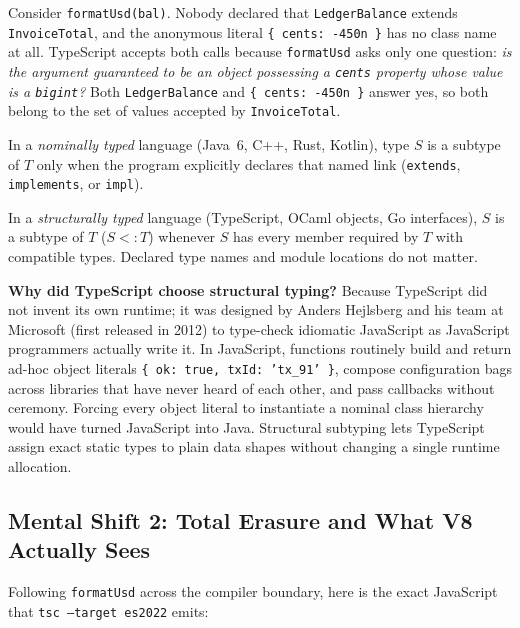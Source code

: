 Consider \texttt{formatUsd(bal)}. Nobody declared that \texttt{LedgerBalance} extends \texttt{InvoiceTotal}, and the anonymous literal \texttt{\{ cents: -450n \}} has no class name at all. TypeScript accepts both calls because \texttt{formatUsd} asks only one question: \emph{is the argument guaranteed to be an object possessing a \texttt{cents} property whose value is a \texttt{bigint}?} Both \texttt{LedgerBalance} and \texttt{\{ cents: -450n \}} answer yes, so both belong to the set of values accepted by \texttt{InvoiceTotal}.

\begin{definition}
\label{ch09:def-nominal-vs-structural}
In a \emph{nominally typed} language (Java~6, C++, Rust, Kotlin), type $S$ is a subtype of $T$ only when the program explicitly declares that named link (\texttt{extends}, \texttt{implements}, or \texttt{impl}).

In a \emph{structurally typed} language (TypeScript, OCaml objects, Go interfaces), $S$ is a subtype of $T$ ($S <: T$) whenever $S$ has every member required by $T$ with compatible types. Declared type names and module locations do not matter.
\end{definition}

\begin{intuitionbox}
\textbf{Why did TypeScript choose structural typing?} Because TypeScript did not invent its own runtime; it was designed by Anders Hejlsberg and his team at Microsoft (first released in 2012) to type-check idiomatic JavaScript as JavaScript programmers actually write it. In JavaScript, functions routinely build and return ad-hoc object literals \texttt{\{ ok: true, txId: 'tx\_91' \}}, compose configuration bags across libraries that have never heard of each other, and pass callbacks without ceremony. Forcing every object literal to instantiate a nominal class hierarchy would have turned JavaScript into Java. Structural subtyping lets TypeScript assign exact static types to plain data shapes without changing a single runtime allocation.
\end{intuitionbox}

\subsection{Mental Shift 2: Total Erasure and What V8 Actually Sees}

Following \texttt{formatUsd} across the compiler boundary, here is the exact JavaScript that \texttt{tsc --target es2022} emits:

